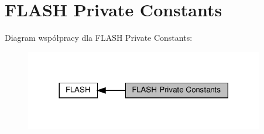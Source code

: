 \hypertarget{group___f_l_a_s_h___private___constants}{}\section{F\+L\+A\+SH Private Constants}
\label{group___f_l_a_s_h___private___constants}
Diagram współpracy dla F\+L\+A\+SH Private Constants\+:\nopagebreak
\begin{figure}[H]
\begin{center}
\leavevmode
\includegraphics[width=296pt]{group___f_l_a_s_h___private___constants}
\end{center}
\end{figure}
